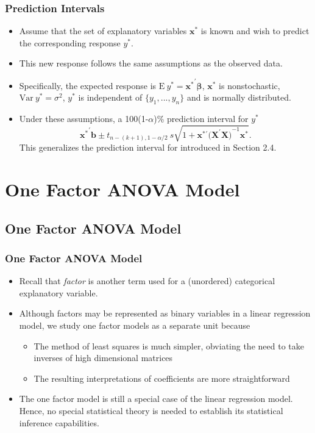 \begin{frame}%
 \frametitle{Prediction Intervals}
   \begin{itemize}
 \item Assume that the set of explanatory variables $
\mathbf{x}^{\ast }$ is known and wish to predict the corresponding response $%
y^{\ast }$.
 \item This new response follows the same assumptions as the observed data.
 \item Specifically, the expected response is $\mathrm{E~}y^{\ast }=%
\mathbf{\mathbf{x}^{\ast }}^{\prime }\boldsymbol \beta $, $\mathbf{\mathbf{x}%
^{\ast }}$ is nonstochastic, $\mathrm{Var~}y^{\ast }=\sigma ^{2}$,
$y^{\ast } $ is independent of $\{y_{1},...,y_{n}\}$ and is normally
distributed.
 \item Under these assumptions, a 100(1-$\alpha $)\%
prediction interval for $y^{\ast }$
\begin{equation*}
\mathbf{\mathbf{x}^{\ast }}^{\prime }\mathbf{b}\pm
t_{n-(k+1),1-\alpha /2} ~s
\sqrt{1+\mathbf{x}^{\ast }{}^{\prime }(\mathbf{X^{\prime }X)}^{-1}\mathbf{x}%
^{\ast }}.
\end{equation*}
This generalizes the prediction interval for introduced in Section
2.4.
    \end{itemize}
\end{frame}

\section{One Factor ANOVA Model}

\subsection{One Factor ANOVA Model}

\begin{frame}%
 \frametitle{One Factor ANOVA Model}
   \begin{itemize}
    \item Recall that \emph{factor} is another term used for a (unordered)
categorical explanatory variable.
 \item Although factors may be represented as binary variables in a
 linear regression model, we study one factor models as a separate
 unit because
    \begin{itemize}
    \item The method of least squares is much simpler, obviating the
    need to take inverses of high dimensional matrices
    \item The resulting interpretations of coefficients are more
    straightforward
         \end{itemize}
    \item The one factor model is still a special case of the linear
    regression model. Hence, no special statistical theory is needed
    to establish its statistical inference capabilities.
     \end{itemize}
\end{frame}

